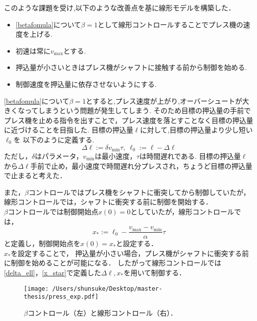 \documentclass [dvipdfmx] {jsarticle}
\numberwithin{equation}{section}
\theoremstyle{definition} %
\theoremstyle{definition} %
\begin{document}
このような課題を受け,以下のような改善点を基に線形モデルを構築した．

\begin{itemize}
    \item \eqref{betafomula}について$\beta=1$として線形コントロールすることでプレス機の速度を上げる. 
    \item 初速は常に$v_{\max}$とする.
    \item 押込量が小さいときはプレス機がシャフトに接触する前から制御を始める.
    \item 制御速度を押込量に依存させないようにする.
\end{itemize}
\eqref{betafomula}について$\beta=1$とすると,プレス速度が上がり,オーバーシュートが大きくなってしまうという問題が発生してしまう.
そのため目標の押込量の手前でプレス機を止める指令を出すことで，プレス速度を落とすことなく目標の押込量に近づけることを目指した.
目標の押込量$\ell$に対して,目標の押込量より少し短い$\ell_0$を
以下のように定義する.
\begin{equation}\label{delta_ell}
    \Delta\ell :=\delta v_{\min}\tau,\ \ell_0:=\ell-\Delta\ell
\end{equation}
ただし，$\delta$はパラメータ，$v_{\min}$は最小速度，$\tau$は時間遅れである.
目標の押込量$\ell$から$\Delta\ell$手前で止め，最小速度で時間遅れ分プレスされ，ちょうど目標の押込量で止まると考えた．

また，$\beta$コントロールではプレス機をシャフトに衝突してから制御していたが，線形コントロールでは，シャフトに衝突する前に制御を開始する．\\
$\beta$コントロールでは制御開始点$x(0)=0$としていたが，線形コントロールでは，
\begin{equation}\label{x_star}
    x_\ast:=\ell_0-\displaystyle\frac{v_{\max}-v_{\min}}{\alpha}\tau
\end{equation}
と定義し，制御開始点を$x(0)=x_\ast$と設定する．\\
$x_\ast$を設定することで，
押込量が小さい場合，プレス機がシャフトに衝突する前に制御を始めることが可能になる．
したがって線形コントロールでは\eqref{delta_ell}，\eqref{x_star}で定義した$\Delta\ell , x_\ast$を用いて制御する．

\begin{figure}[hbt]
    \centering
    \texttt{[image: /Users/shunsuke/Desktop/master-thesis/press\_exp.pdf]}
    \caption{$\beta$コントロール（左）と線形コントロール（右）．}
    \label{Sample p.2}
\end{figure}
\newpage
\end{document}
